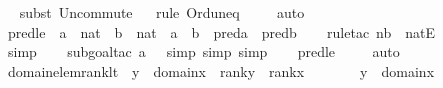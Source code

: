 \begin{isabellebody}
%
\isadelimproof
\ \ %
\endisadelimproof
%
\isatagproof
{}\isamarkupfalse%
{\isacharparenleft}{\kern0pt}subst\ Un{\isacharunderscore}{\kern0pt}commute{\isacharparenright}{\kern0pt}\isanewline
\ \ \isamarkupfalse%
{\isacharparenleft}{\kern0pt}rule\ Ord{\isacharunderscore}{\kern0pt}un{\isacharunderscore}{\kern0pt}eq{}{\isacharparenright}{\kern0pt}\ \isanewline
\ \ \isamarkupfalse%
\ auto%
\endisatagproof
{\isafoldproof}%
%
\isadelimproof
\isanewline
%
\endisadelimproof
\isanewline
{}\isamarkupfalse%
\ pred{\isacharunderscore}{\kern0pt}le{\isacharprime}{\kern0pt}\ {\isacharcolon}{\kern0pt}\ {\isachardoublequoteopen}a\ {\isasymin}\ nat\ {\isasymLongrightarrow}\ b\ {\isasymin}\ nat\ {\isasymLongrightarrow}\ a\ {\isasymle}\ b\ {\isasymLongrightarrow}\ pred{\isacharparenleft}{\kern0pt}a{\isacharparenright}{\kern0pt}\ {\isasymle}\ pred{\isacharparenleft}{\kern0pt}b{\isacharparenright}{\kern0pt}{\isachardoublequoteclose}\ \isanewline
%
\isadelimproof
\ \ %
\endisadelimproof
%
\isatagproof
{}\isamarkupfalse%
{\isacharparenleft}{\kern0pt}rule{\isacharunderscore}{\kern0pt}tac\ n{\isacharequal}{\kern0pt}b\ \ natE{\isacharparenright}{\kern0pt}\isanewline
\ \ \ \ \isamarkupfalse%
\ simp\isanewline
\ \ \ \isamarkupfalse%
{\isacharparenleft}{\kern0pt}subgoal{\isacharunderscore}{\kern0pt}tac\ {\isachardoublequoteopen}a\ {\isacharequal}{\kern0pt}\ {}{\isachardoublequoteclose}{\isacharcomma}{\kern0pt}\ simp{\isacharcomma}{\kern0pt}\ simp{\isacharcomma}{\kern0pt}\ simp{\isacharparenright}{\kern0pt}\isanewline
\ \ \isamarkupfalse%
\ pred{\isacharunderscore}{\kern0pt}le\ \isanewline
\ \ \isamarkupfalse%
\ auto%
\endisatagproof
{\isafoldproof}%
%
\isadelimproof
\isanewline
%
\endisadelimproof
\isanewline
{}\isamarkupfalse%
\ domain{\isacharunderscore}{\kern0pt}elem{\isacharunderscore}{\kern0pt}rank{\isacharunderscore}{\kern0pt}lt\ {\isacharcolon}{\kern0pt}\ {\isachardoublequoteopen}y\ {\isasymin}\ domain{\isacharparenleft}{\kern0pt}x{\isacharparenright}{\kern0pt}\ {\isasymLongrightarrow}\ rank{\isacharparenleft}{\kern0pt}y{\isacharparenright}{\kern0pt}\ {\isacharless}{\kern0pt}\ rank{\isacharparenleft}{\kern0pt}x{\isacharparenright}{\kern0pt}{\isachardoublequoteclose}\ \isanewline
%
\isadelimproof
%
\endisadelimproof
%
\isatagproof
{}\isamarkupfalse%
\ {\isacharminus}{\kern0pt}\ \isanewline
\ \ \isamarkupfalse%
\ {\isachardoublequoteopen}y\ {\isasymin}\ domain{\isacharparenleft}{\kern0pt}x{\isacharparenright}{\kern0pt}{\isachardoublequoteclose}\ \isanewline

\end{isabellebody}
